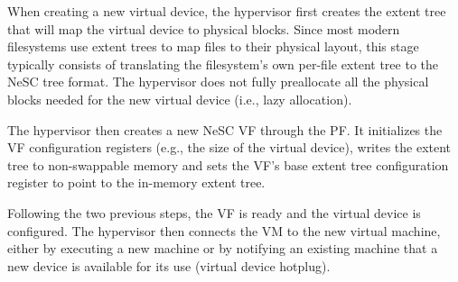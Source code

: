 When creating a new virtual device, the hypervisor first creates the extent tree that will map the virtual device to physical blocks. Since most modern filesystems use extent trees to map files to their physical layout, this stage typically consists of translating the filesystem's own per-file extent tree to the NeSC tree format. The hypervisor does not fully preallocate all the physical blocks needed for the new virtual device (i.e., lazy allocation). 

The hypervisor then creates a new NeSC VF through the PF. It initializes the VF configuration registers (e.g., the size of the virtual device), writes the extent tree to non-swappable memory and sets the VF's base extent tree configuration register to point to the in-memory extent tree.

Following the two previous steps, the VF is ready and the virtual device is configured. The hypervisor then connects the VM to the new virtual machine, either by executing a new machine or by notifying an existing machine that a new device is available for its use (virtual device hotplug).

